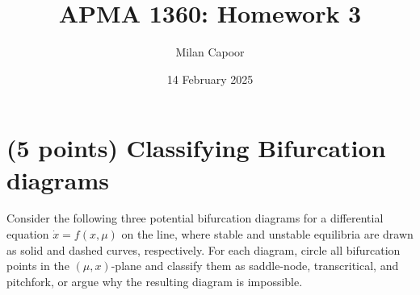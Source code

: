 \documentclass[12pt]{article}
\title{APMA 1360: Homework 3}
\author{Milan Capoor}
\date{14 February 2025}
\begin{document}
\maketitle

\section{(5 points) Classifying Bifurcation diagrams}
Consider the following three potential bifurcation diagrams for a differential equation $\dot{x}=f(x,\mu)$ on the line, where stable and unstable equilibria are drawn as solid and dashed curves, respectively. For each diagram, circle all bifurcation points in the $(\mu,x)$-plane and classify them as saddle-node, transcritical, and pitchfork, or argue why the resulting diagram is impossible.
\begin{center}
\end{center}
\end{document}
